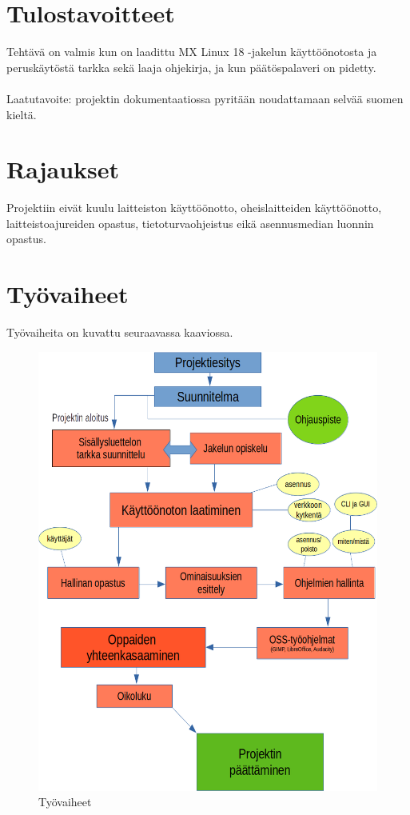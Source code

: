\documentclass[a4paper, 12pt, finnish]{article}
\begin{document}
\section{Tulostavoitteet}
Tehtävä on valmis kun on laadittu MX Linux 18 -jakelun käyttöönotosta ja peruskäytöstä tarkka sekä laaja ohjekirja, ja kun päätöspalaveri on pidetty.
\\\\
Laatutavoite: projektin dokumentaatiossa pyritään noudattamaan selvää suomen kieltä.

\section{Rajaukset}
Projektiin eivät kuulu laitteiston käyttöönotto, oheislaitteiden käyttöönotto, laitteistoajureiden opastus, tietoturvaohjeistus eikä asennusmedian luonnin opastus.
\section{Työvaiheet}
Työvaiheita on kuvattu seuraavassa kaaviossa.
\begin{figure}[!htpb]
    \centering
    \includegraphics[width=\textwidth]{kaaviokuva}
    \caption{Työvaiheet}
    \label{}
\end{figure}
\end{document}
